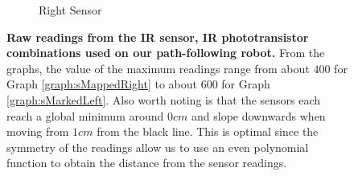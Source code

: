 \documentclass[]{report}
\newcommand{\rpm}{\raisebox{.2ex}{$\scriptstyle\pm$}}
\begin{document}
\begin{figure}
{\begin{subfigure}{0.45\textwidth}
			\caption{Right Sensor}
			\label{graph:sRawRight}
		\end{subfigure}
		\caption{\textbf{Raw readings from the IR sensor, IR phototransistor combinations used on our path-following robot.} From the graphs, the value of the maximum readings range from about $400$ for Graph \ref{graph:sMappedRight} to about $600$ for Graph \ref{graph:sMarkedLeft}. Also worth noting is that the sensors each reach a global minimum around $0cm$ and slope downwards when moving from \rpm$1cm$ from the black line. This is optimal since the symmetry of the readings allow us to use an even polynomial function to obtain the distance from the sensor readings.}
	}
	\label{graph:sRaw}
\end{figure}
\end{document}
